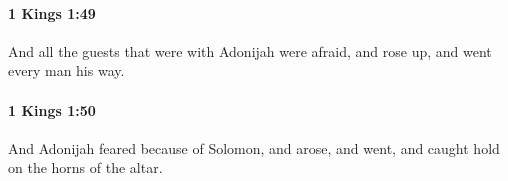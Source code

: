 		\paragraph{1 Kings 1:49} %
			\label{1KINGS-1-49}

			And all the guests that were with Adonijah were afraid, and rose up, and went every man his way.


		\paragraph{1 Kings 1:50} %
			\label{1KINGS-1-50}

			And Adonijah feared because of Solomon, and arose, and went, and caught hold on the horns of the altar.


